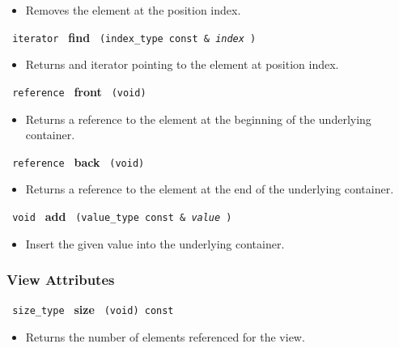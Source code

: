 \begin{itemize}
\item
Removes the element at the position index.
\end{itemize}

\noindent
\texttt{%
iterator
}
\newline
\textbf{find}%
\texttt{%
(index\_type const \&
\textit{index}%
)
}

\begin{itemize}
\item
Returns and iterator pointing to the element at position index.
\end{itemize}

\noindent
\texttt{%
reference
}
\newline
\textbf{front}%
\texttt{%
(void)
}

\begin{itemize}
\item
Returns a reference to the element at the beginning of the underlying container.
\end{itemize}

\noindent
\texttt{%
reference
}
\newline
\textbf{back}%
\texttt{%
(void)
}

\begin{itemize}
\item
Returns a reference to the element at the end of the underlying container.
\end{itemize}

\noindent
\texttt{%
void
}
\newline
\textbf{add}%
\texttt{%
(value\_type const \&
\textit{value}%
)
}

\begin{itemize}
\item
Insert the given value into the underlying container.
\end{itemize}

\subsubsection{ View Attributes}

\noindent
\texttt{%
size\_type
}
\newline
\textbf{size}%
\texttt{%
(void) const
}

\begin{itemize}
\item
Returns the number of elements referenced for the view.
\end{itemize}

